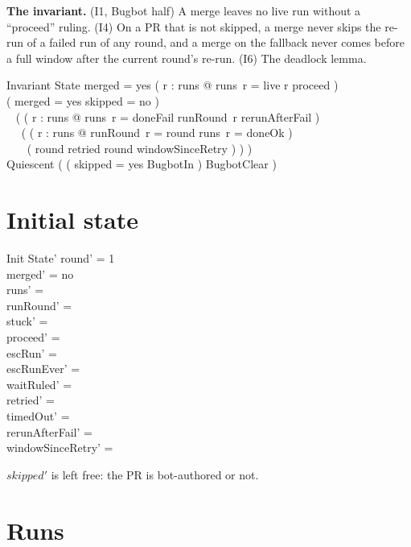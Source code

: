 \documentclass{article}
\begin{document}
\textbf{The invariant.}
(I1, Bugbot half) A merge leaves no live run without a ``proceed'' ruling.
(I4) On a PR that is not skipped, a merge never skips the re-run of a failed
run of any round, and a merge on the fallback never comes before a full
window after the current round's re-run.
(I6) The deadlock lemma.

\begin{schema}{Invariant}
  State
\where
  merged = yes \implies ( \forall r : \dom runs @ runs~r = live \implies r \in proceed ) \\
  ( merged = yes \land skipped = no ) \implies \\
  \quad~ ( ( \forall r : \dom runs @ runs~r = doneFail \implies runRound~r \in rerunAfterFail ) \land \\
  \quad~\quad~ ( ( \exists r : \dom runs @ runRound~r = round \land runs~r = doneOk ) \lor \\
  \quad~\quad~\quad~ ( round \in retried \implies round \in windowSinceRetry ) ) ) \\
  Quiescent \implies ( ( skipped = yes \lor BugbotIn ) \land BugbotClear )
\end{schema}

\section{Initial state}

\begin{schema}{Init}
  State'
\where
  round' = 1 \\
  merged' = no \\
  runs' = \emptyset \\
  runRound' = \emptyset \\
  stuck' = \emptyset \\
  proceed' = \emptyset \\
  escRun' = \emptyset \\
  escRunEver' = \emptyset \\
  waitRuled' = \emptyset \\
  retried' = \emptyset \\
  timedOut' = \emptyset \\
  rerunAfterFail' = \emptyset \\
  windowSinceRetry' = \emptyset
\end{schema}

$skipped'$ is left free: the PR is bot-authored or not.

\section{Runs}
\end{document}
